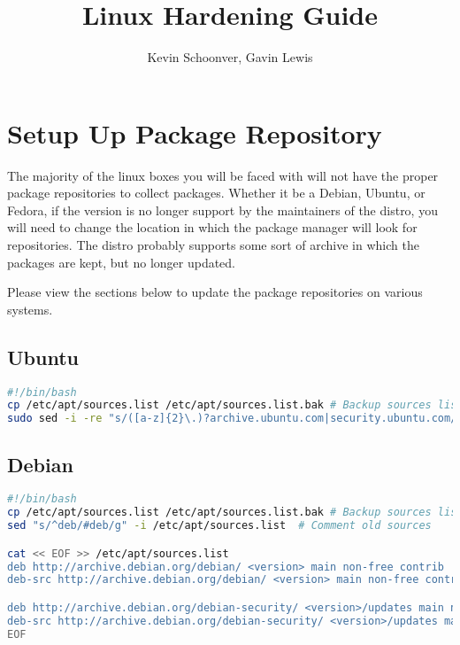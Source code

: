 \documentclass{article}
\title{\textbf{Linux Hardening Guide}}
\author{Kevin Schoonver, Gavin Lewis}
\begin{document}
\maketitle

\tableofcontents 

\pagebreak 

\section{Setup Up Package Repository}
The majority of the linux boxes you will be faced with will not have the proper
package repositories to collect packages. Whether it be a Debian, Ubuntu, or
Fedora, if the version is no longer support by the maintainers of the distro,
you will need to change the location in which the package manager will look for
repositories. The distro probably supports some sort of archive in which the
packages are kept, but no longer updated. 

Please view the sections below to update the package repositories on various
systems.

\subsection{Ubuntu}
\begin{lstlisting}[language=bash]
#!/bin/bash
cp /etc/apt/sources.list /etc/apt/sources.list.bak # Backup sources list
sudo sed -i -re "s/([a-z]{2}\.)?archive.ubuntu.com|security.ubuntu.com/old-releases.ubuntu.com/g" /etc/apt/sources.list
\end{lstlisting}

\subsection{Debian}
\begin{lstlisting}[language=bash]
#!/bin/bash
cp /etc/apt/sources.list /etc/apt/sources.list.bak # Backup sources list
sed "s/^deb/#deb/g" -i /etc/apt/sources.list  # Comment old sources

cat << EOF >> /etc/apt/sources.list
deb http://archive.debian.org/debian/ <version> main non-free contrib
deb-src http://archive.debian.org/debian/ <version> main non-free contrib

deb http://archive.debian.org/debian-security/ <version>/updates main non-free contrib
deb-src http://archive.debian.org/debian-security/ <version>/updates main non-free contrib
EOF
\end{lstlisting}
\end{document}
